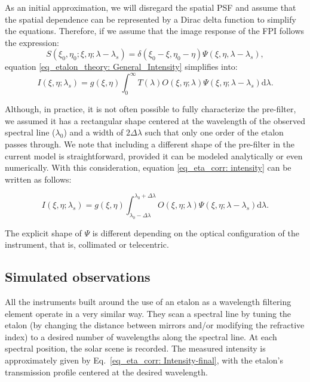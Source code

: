 As an initial approximation, we will disregard the spatial PSF and assume that the spatial dependence can be represented by a Dirac delta function to simplify the equations. Therefore, if we assume that the image response of the FPI follows the expression:
\begin{equation}
S\left(\xi_0, \eta_0; \xi , \eta; \lambda-\lambda_{s}\right)=\delta(\xi_0-\xi,\eta_0-\eta)\Psi(\xi,\eta,\lambda-\lambda_s),
\end{equation}
equation \eqref{eq_etalon_theory: General_Intensity} simplifies into:
\begin{equation}
    I\left(\xi, \eta ; \lambda_{s}\right)=g(\xi, \eta)\int_{0}^{\infty} T(\lambda)  O\left(\xi, \eta ; \lambda\right) \Psi\left(\xi, \eta ; \lambda-\lambda_{s}\right)  \mathrm{d} \lambda.
    \label{eq_eta_corr: intensity}
\end{equation}

Although, in practice, it is not often possible to fully characterize the pre-filter, we assumed it has a rectangular shape centered at the wavelength of the observed spectral line ($\lambda _ {0}$) and a width of $2\Delta \lambda$ such that only one order of the etalon passes through. We note that including a different shape of the pre-filter in the current model is straightforward, provided it can be modeled analytically or even numerically. With this consideration, equation \eqref{eq_eta_corr: intensity} can be written as follows:

\begin{equation}
    I(\xi, \eta ; \lambda_{s})=g(\xi, \eta)\int_{\lambda _{0} - \Delta \lambda}^{\lambda _ {0} + \Delta \lambda}  O(\xi, \eta ; \lambda)  \Psi(\xi, \eta ; \lambda-\lambda_{s})  \mathrm{d} \lambda .
    \label{eq_eta_corr: Intensity-final}
\end{equation}

The explicit shape of $\Psi$ is different depending on the optical configuration of the instrument, that is, collimated or telecentric.

\subsection{\label{eta_corr_susec: simulating obs} Simulated observations}
  
All the instruments built around the use of an etalon as a wavelength filtering element operate in a very similar way. They scan a spectral line by tuning the etalon (by changing the distance between mirrors and/or modifying the refractive index) to a desired number of wavelengths along the spectral line. At each spectral position, the solar scene is recorded. The measured intensity is approximately given by Eq.~\eqref{eq_eta_corr: Intensity-final}, with the etalon's transmission profile centered at the desired wavelength.

